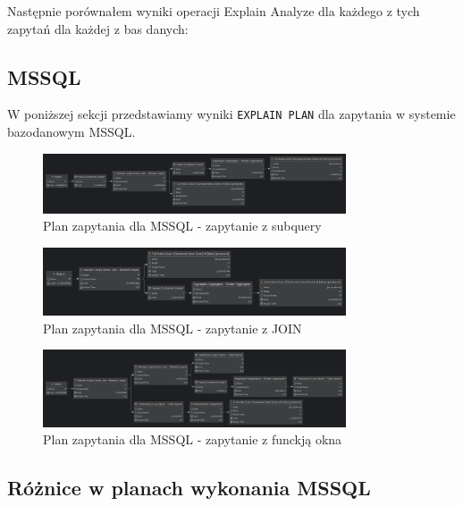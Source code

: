 \documentclass{article}
\begin{document}
Następnie porównałem wyniki operacji Explain Analyze dla każdego z tych zapytań dla każdej z bas danych:

\subsection*{MSSQL}

W poniższej sekcji przedstawiamy wyniki \texttt{EXPLAIN PLAN} dla zapytania w systemie bazodanowym MSSQL.

\begin{figure}[H]
    \centering
    \includegraphics[width=0.8\textwidth]{../images/mssql_subquery_explain.png}
    \caption{Plan zapytania dla MSSQL - zapytanie z subquery}
    \label{fig:mssql1}
\end{figure}

\begin{figure}[H]
    \centering
    \includegraphics[width=0.8\textwidth]{../images/mssql_join_explain.png}
    \caption{Plan zapytania dla MSSQL - zapytanie z JOIN}
    \label{fig:mssql2}
\end{figure}

\begin{figure}[H]
    \centering
    \includegraphics[width=0.8\textwidth]{../images/mssql_window_explain.png}
    \caption{Plan zapytania dla MSSQL - zapytanie z funckją okna}
    \label{fig:mssql3}
\end{figure}

\subsection*{Różnice w planach wykonania MSSQL}
\end{document}

